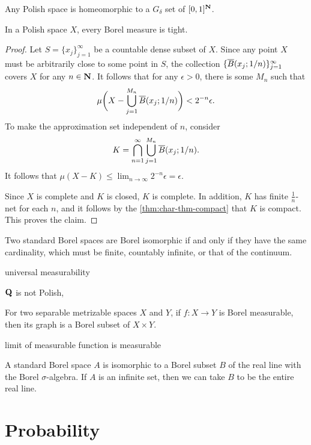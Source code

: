 \documentclass[10pt]{book}
\begin{document}
\begin{prop}
    Any Polish space is homeomorphic to a $G_\delta$ set of $[0,1]^{\mathbf{N}}$.
\end{prop}


\begin{namedthm} \label{thm:Ulam}
    In a Polish space $X$, every Borel measure is tight.
\end{namedthm}
\begin{proof}
    Let $S = \{x_j\}_{j=1}^\infty$ be a countable dense subset of $X$. Since any point $X$ must be arbitrarily close to some point in $S$, the collection $\{\overline{B}(x_j;1/n)\}_{j=1}^\infty$ covers $X$ for any $n\in \mathbf{N}$. It follows that for any $\epsilon > 0$, there is some $M_n$ such that \[
        \mu\biggl(X - \bigcup_{j=1}^{M_n}\overline{B}(x_j ; 1/n)\biggr) <  2^{-n} \epsilon.
    \] To make the approximation set independent of $n$, consider \[
        K = \bigcap_{n=1}^\infty \bigcup_{j=1}^{M_n}\overline{B}(x_j ; 1/n).
    \] It follows that $\mu(X - K) \leq \lim_{n\to \infty } 2^{-n} \epsilon = \epsilon$.

    Since $X$ is complete and $K$ is closed, $K$ is complete. In addition, $K$ has finite $\frac{1}{n}$-net for each $n$, and it follows by the \cref{thm:char-thm-compact} that $K$ is compact. This proves the claim.
\end{proof}

\begin{thm}
    Two standard Borel spaces are Borel isomorphic if and only if they have the same cardinality, which must be finite, countably infinite, or that of the continuum.
\end{thm}

universal measurability

$\mathbf{Q}$ is not Polish, 

For two separable metrizable spaces $X$ and $Y$, if $f\colon X \to Y$ is Borel measurable, then its graph is a Borel subset of $X \times Y$.

limit of measurable function is measurable

\begin{cor}
    A standard Borel space $A$ is isomorphic to a Borel subset $B$ of the real line with the Borel $\sigma$-algebra. If $A$ is an infinite set, then we can take $B$ to be the entire real line.
\end{cor}



\part{Probability}



\end{document}
